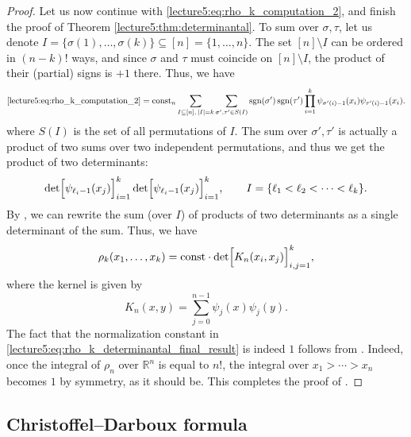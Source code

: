 \documentclass[letterpaper,11pt,oneside,reqno]{book}
\numberwithin{equation}{chapter}  %
\theoremstyle{definition}
\begin{document}
\begin{proof}
Let us now continue with \eqref{lecture5:eq:rho_k_computation_2}, and finish the proof of Theorem \ref{lecture5:thm:determinantal}.
To sum over $\sigma,\tau$, let us denote
$I=\{\sigma(1),\ldots,\sigma(k) \}\subseteq [n]=\{1,\ldots,n \}$.
The set $[n]\setminus I$ can be ordered in $(n-k)!$ ways, and since
$\sigma $ and $\tau$ must coincide on $[n]\setminus I$, the product of their
(partial) signs is $+1$ there. Thus, we have
\begin{equation*}
	\eqref{lecture5:eq:rho_k_computation_2}=
	\mathrm{const}_n\sum_{I\subseteq [n],\,|I|=k}
	\sum_{\sigma',\tau'\in S(I)}
	\operatorname{sgn}(\sigma')\operatorname{sgn}(\tau')
	\prod_{i=1}^k \psi_{\sigma'(i)-1}(x_i)\psi_{\tau'(i)-1}(x_i)  .
\end{equation*}
where $S(I)$ is the set of all permutations of \(I\).
The sum over $\sigma',\tau'$ is actually a product of two
sums over two independent permutations, and thus we get the product
of two determinants:
\begin{equation*}
	\det\Bigl[\psi_{\ell_i-1}(x_j)\Bigr]_{i=1}^{k}
	\det\Bigl[\psi_{\ell_i-1}(x_j)\Bigr]_{i=1}^{k},
	\qquad I=\{\ell_1<\ell_2<\cdots<\ell_k \}.
\end{equation*}
By , we can rewrite the sum (over $I$)
of products
of two determinants as a single determinant of the sum. Thus, we have
\begin{equation}
\rho_k(x_1,\dots,x_k)=
\mathrm{const}\cdot
\det\Bigl[K_n(x_i,x_j)\Bigr]_{i,j=1}^k, \label{lecture5:eq:rho_k_determinantal_final_result}
\end{equation}
where the kernel is given by
\[
K_n(x,y)=\sum_{j=0}^{n-1}\psi_j(x)\psi_j(y).
\]
The fact that the normalization constant
in \eqref{lecture5:eq:rho_k_determinantal_final_result}
is indeed $1$ follows from .
Indeed, once the integral of $\rho_n$ over $\mathbb{R}^n$ is equal to \(n!\),
the integral over $x_1>\cdots>x_n$ becomes $1$ by symmetry, as it should be.
This completes the proof of .
\end{proof}

\subsection{Christoffel--Darboux formula}
\end{document}
